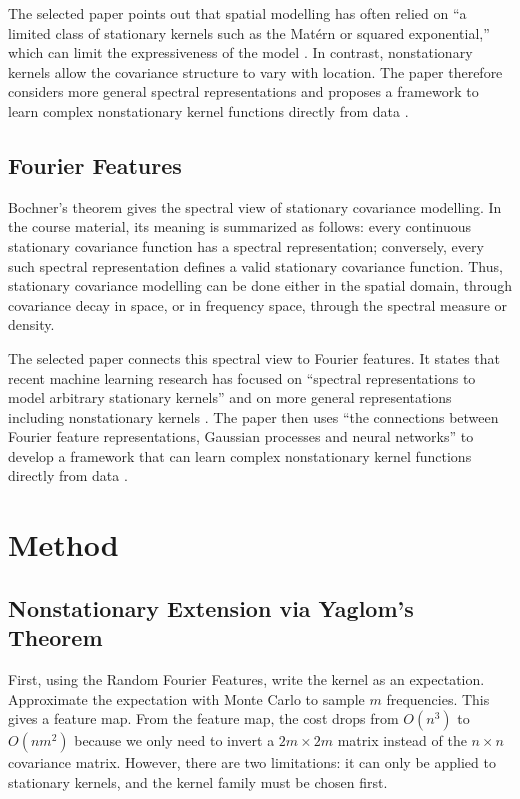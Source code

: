 \documentclass[11pt,a4paper]{article}
\begin{document}
The selected paper points out that spatial modelling has often relied on ``a limited class of stationary kernels such as the Mat\'ern or squared exponential,'' which can limit the expressiveness of the model \citep[p.~59]{ton2018spatial}. In contrast, nonstationary kernels allow the covariance structure to vary with location. The paper therefore considers more general spectral representations and proposes a framework to learn complex nonstationary kernel functions directly from data \citep{ton2018spatial}.

\subsection{Fourier Features}

Bochner's theorem gives the spectral view of stationary covariance modelling. In the course material, its meaning is summarized as follows: every continuous stationary covariance function has a spectral representation; conversely, every such spectral representation defines a valid stationary covariance function. Thus, stationary covariance modelling can be done either in the spatial domain, through covariance decay in space, or in frequency space, through the spectral measure or density.

The selected paper connects this spectral view to Fourier features. It states that recent machine learning research has focused on ``spectral representations to model arbitrary stationary kernels'' and on more general representations including nonstationary kernels \citep[p.~59]{ton2018spatial}. The paper then uses ``the connections between Fourier feature representations, Gaussian processes and neural networks'' to develop a framework that can learn complex nonstationary kernel functions directly from data \citep[p.~59]{ton2018spatial}.

\section{Method}

\subsection{Nonstationary Extension via Yaglom's Theorem}
First, using the Random Fourier Features, write the kernel as an expectation.
Approximate the expectation with Monte Carlo to sample $m$ frequencies. This
gives a feature map. From the feature map, the cost drops from $O(n^3)$ to
$O(nm^2)$ because we only need to invert a $2m \times 2m$ matrix instead of
the $n \times n$ covariance matrix. However, there are two limitations: it
can only be applied to stationary kernels, and the kernel family must be
chosen first.
\end{document}
